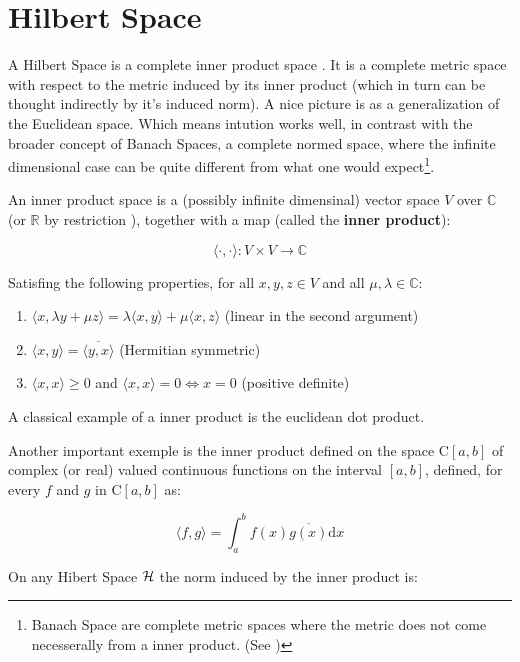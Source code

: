 
\section{Hilbert Space}

A Hilbert Space is a complete inner product space \cite{HS-YN:11}. It is a
complete metric space with respect to the metric induced by its inner product
(which in turn can be thought indirectly by it's induced norm). A nice picture
is as a generalization of the Euclidean space. Which means intution works well,
in contrast with the broader concept of Banach Spaces, a complete normed space,
where the infinite dimensional case can be quite different from what one would
expect\footnote{Banach Space are complete metric spaces where the metric does
not come necesserally from a inner product. (See \citet{HS-HJNB:00})}.

An inner product space\cite{HS-HJNB:00} is a (possibly infinite dimensinal)
vector space $V$ over $\mathbb{C}$ (or $\mathbb{R}$ by restriction ), together
with a map (called the \textbf{inner product}):

\[  \langle\cdot,\cdot\rangle: V \times V \to \mathbb{C} \]

Satisfing the following properties, for all $x,y,z \in V$ and all $\mu, \lambda
\in \mathbb{C}$:

\begin{enumerate}[I]
  \item \(  \langle x,\lambda y + \mu z  \rangle = \lambda\langle	 x,y\rangle +
  \mu \langle x,z \rangle \) (linear in the second argument)
  \item \( \langle x,y \rangle = \overline{\langle y,x \rangle } \) (Hermitian
  symmetric)
  \item  \( \langle x,x \rangle \geq 0 \) and \( \langle x,x \rangle = 0
  \Leftrightarrow x = 0 \) (positive definite)
\end{enumerate}

A classical example of a inner product is the euclidean dot product.

Another important exemple is the inner product defined on the space C$[a,b]$ of
complex (or real) valued continuous functions on the interval $[a,b]$, defined,
for every $f$ and $g$ in C$[a,b]$ as:

\begin{equation}\label{eq::func_inner}
  \langle f,g\rangle = \int_a^b f(x)\overline{g(x)} \mathrm{d}x
\end{equation}

On any Hibert Space $\mathcal{H}$ the norm induced by the inner product is:

